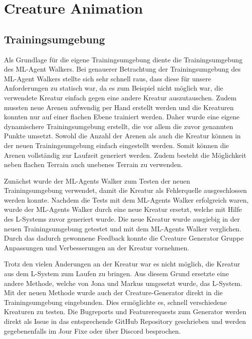 \section{Creature Animation}

\subsection{Trainingsumgebung}
Als Grundlage für die eigene Trainingsumgebung diente die Trainingsumgebung des ML-Agent Walkers. Bei genauerer Betrachtung der Trainingsumgebung des ML-Agent Walkers stellte sich sehr schnell raus, dass diese für unsere Anforderungen zu statisch war, da es zum Beispiel nicht möglich war, die verwendete Kreatur einfach gegen eine andere Kreatur auszutauschen. Zudem mussten neue Arenen aufwendig per Hand erstellt werden und die Kreaturen konnten nur auf einer flachen Ebene trainiert werden. Daher wurde eine eigene dynamischere Trainingsumgebung erstellt, die vor allem die zuvor genannten Punkte umsetzt. Sowohl die Anzahl der Arenen als auch die Kreatur können in der neuen Trainingsumgebung einfach eingestellt werden. Somit können die Arenen vollständig zur Laufzeit generiert werden. Zudem besteht die Möglichkeit neben flachen Terrain auch unebenes Terrain zu verwenden.

Zunächst wurde der ML-Agents Walker zum Testen der neuen Trainingsumgebung verwendet, damit die Kreatur als Fehlerquelle ausgeschlossen werden konnte. Nachdem die Tests mit dem ML-Agents Walker erfolgreich waren, wurde der ML-Agents Walker durch eine neue Kreatur ersetzt, welche mit Hilfe des L-Systems zuvor generiert wurde. Die neue Kreatur wurde ausgiebig in der neuen Trainingsumgebung getestet und mit dem ML-Agents Walker verglichen. Durch das dadurch gewonnene Feedback konnte die Creature Generator Gruppe Anpassungen und Verbesserungen an der Kreatur vornehmen.

Trotz den vielen Änderungen an der Kreatur war es nicht möglich, die Kreatur aus dem L-System zum Laufen zu bringen. Aus diesem Grund ersetzte eine andere Methode, welche von Jona und Markus umgesetzt wurde, das L-System. Mit der neuen Methode wurde auch der Creature-Generator direkt in die Trainingsumgebung eingebunden. Dies ermöglichte es, schnell verschiedene Kreaturen zu testen. Die Bugreports und Featurerequests zum Generator werden direkt als Issue in das entsprechende GitHub Repository geschrieben und werden gegebenenfalls im Jour Fixe oder über Discord besprochen.

